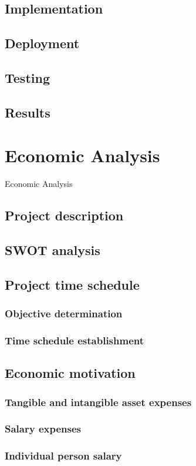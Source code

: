 \documentclass[12pt,a4paper]{report}
\begin{document}
\section{Implementation}
\section{Deployment}
\section{Testing}
\section{Results}

\chapter{Economic Analysis}
Economic Analysis
\section{Project description}
\section{SWOT analysis}
\section{Project time schedule}
\subsection{Objective determination}
\subsection{Time schedule establishment}
\section{Economic motivation}
\subsection{Tangible and intangible asset expenses}
\subsection{Salary expenses}
\subsection{Individual person salary}
\end{document}
